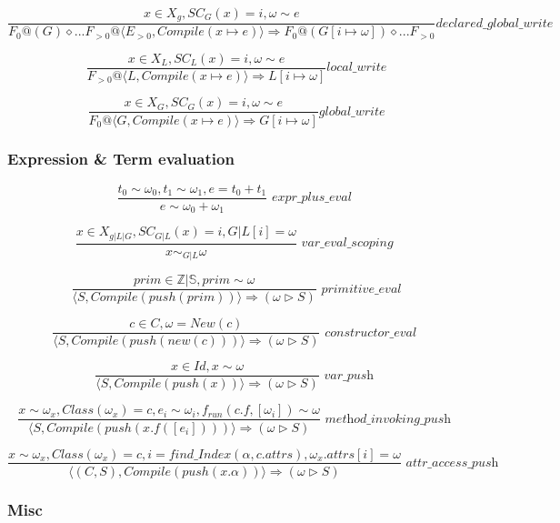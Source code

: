 \documentclass[]{article}
\numberwithin{equation}{section}
\numberwithin{figure}{section}
\numberwithin{table}{section}
\begin{document}
\[\frac{x \in X_g, SC_G(x) = i, \omega \sim e}
        {F_0@(G) \diamond ... F_{>0}@\langle E_{>0}, Compile (x \mapsto e) \rangle \Rightarrow F_0@(G[i \mapsto \omega]) \diamond ... F_{>0}} \textit{declared\_global\_write} \]

\[\frac{x \in X_L, SC_L(x) = i, \omega \sim e}
        {F_{>0}@\langle L, Compile (x \mapsto e) \rangle \Rightarrow L[i \mapsto \omega]} \textit{local\_write} \]

\[\frac{x \in X_G, SC_G(x) = i, \omega \sim e}
        {F_0@\langle G, Compile (x \mapsto e) \rangle \Rightarrow G[i \mapsto \omega]} \textit{global\_write} \]

\subsubsection{Expression \& Term evaluation}\label{expression-term-evaluation}

\[\frac{t_0 \sim \omega_0, t_1 \sim \omega_1, e = t_0 + t_1}
        {e \sim \omega_0 + \omega_1} \textit{ expr\_plus\_eval }\]

\[\frac{x \in X_{g|L|G}, SC_{G|L}(x) = i, G|L[i] = \omega}{x \sim_{G|L} \omega} \textit{ var\_eval\_scoping } \]

\[\frac{prim \in \mathbb{Z|S}, prim \sim \omega}
        {\langle S, Compile(push(prim)) \rangle \Rightarrow (\omega \rhd S)} \textit{ primitive\_eval} \]

\[\frac{c \in C, \omega = New(c)}
        {\langle S, Compile(push(new(c))) \rangle \Rightarrow (\omega \rhd S)} \textit{ constructor\_eval } \]

\[\frac{x \in Id, x \sim \omega}
        {\langle S, Compile(push(x)) \rangle \Rightarrow (\omega \rhd S)} \textit{ var\_push } \]

\[\frac{x \sim \omega_x, Class(\omega_x) = c,  e_i \sim \omega_i, f_{run}(c.f, [\omega_i]) \sim \omega}
        {\langle S, Compile(push(x.f([e_i]))) \rangle \Rightarrow (\omega \rhd S)} \textit{ method\_invoking\_push } \]

\[\frac{x \sim \omega_x, Class(\omega_x) = c, i = find\_Index(\alpha, c.attrs), \omega_x.attrs[i] = \omega }
        {\langle (C, S), Compile(push(x.\alpha)) \rangle \Rightarrow (\omega \rhd S)} \textit{ attr\_access\_push } \]

\subsubsection{Misc}\label{equivalence}
\end{document}
